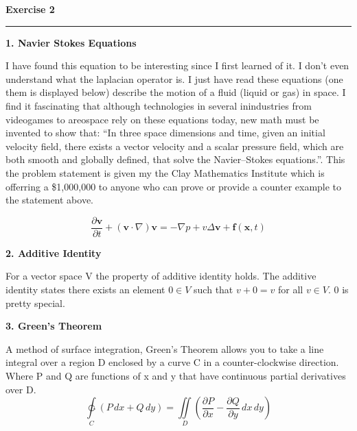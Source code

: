 \documentclass{article}
\begin{document}
\newpage
\noindent \textbf{Exercise 2}

\noindent \rule{\textwidth}{.1mm}

\begin{center}
\textbf{1. Navier Stokes Equations}
\end{center}

I have found this equation to be interesting since I first learned of it. I don't even understand what the laplacian operator is. I just have read these equations (one them is displayed below) describe the motion of a fluid (liquid or gas) in space. I find it fascinating that although technologies in several inindustries from videogames to areospace rely on these equations today, new math must be invented to show that: ``In three space dimensions and time, given an initial velocity field, there exists a vector velocity and a scalar pressure field, which are both smooth and globally defined, that solve the Navier–Stokes equations.''. This the problem statement is given my the Clay Mathematics Institute which is offerring a \$1,000,000 to anyone who can prove or provide a counter example to the statement above.

\begin{equation*}
\frac{\partial \mathbf{v}}{\partial t} + \left( \mathbf{v} \cdot \nabla \right) \mathbf{v} =  - \nabla p + v \Delta \mathbf{v} + \mathbf{f}\left( \mathbf{x}, t\right)
\end{equation*}

\begin{center}
\textbf{2. Additive Identity}
\end{center}

For a vector space V the property of additive identity holds. The additive identity states there exists an element \(0 \in V\) such that \(v + 0 = v\) for all \(v \in V\). \(0\) is pretty special.

\begin{center}
\textbf{3. Green's Theorem}
\end{center}

A method of surface integration, Green's Theorem allows you to take a line integral over a region D enclosed by a curve C in a counter-clockwise direction. Where P and Q are functions of x and y that have continuous partial derivatives over D.
\begin{equation*}
\ointctrclockwise\limits_C \left( P \, dx + Q \, dy \right) = \iint\limits_D \left( \frac{\partial P}{\partial x} - \frac{\partial Q}{\partial y} \, dx \, dy \right)
\end{equation*}
\end{document}
